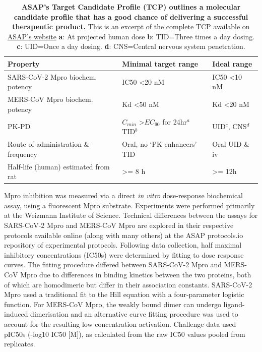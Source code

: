 \documentclass[journal=jcim,manuscript=article]{achemso}
\begin{document}
\begin{table}[]
\begin{tabular}{lll}
Property & Minimal target range & Ideal range \\ \hline
SARS-CoV-2 Mpro biochem. potency & IC50 \textless 20 nM & IC50 \textless 10 nM \\
MERS-CoV Mpro biochem. potency & Kd \textless 50 nM & Kd \textless 20 nM \\
PK-PD & $C_{min}$ \textgreater $EC_{90}$ for 24hr$^{a}$ TID$^{b}$ & UID$^{c}$, CNS$^{d}$ \\
Route of administration \& frequency & Oral, no ‘PK enhancers’ TID & Oral UID \& iv \\
Half-life (human) estimated from rat & \textgreater{}= 8 h & \textgreater{}= 12h
\end{tabular}
\caption{\textbf{ASAP's Target Candidate Profile (TCP) outlines a molecular candidate profile that has a good chance of delivering a successful therapeutic product.} This is an excerpt of the complete TCP available on \hyperlink{https://docs.google.com/presentation/d/1uZht18ZJnHuwMtwxY4prDBSl4SFMK-ics4ERhDgiJ2s/edit?slide=id.g285bac68500_0_227#slide=id.g285bac68500_0_227}{ASAP's website} \textbf{a}: At projected human dose\cite{page_2015} \textbf{b}: TID=Three times a day dosing. \textbf{c}: UID=Once a day dosing. \textbf{d}: CNS=Central nervous system penetration. }
\label{table_tcp}
\end{table}
Mpro inhibition was measured via a direct \textit{in vitro} dose-response biochemical assay, using a fluorescent Mpro substrate. Experiments were performed primarily at the Weizmann Institute of Science. Technical differences between the assays for SARS-CoV-2 Mpro\cite{sars_mpro_dose_response_protocol} and MERS-CoV Mpro\cite{mers_mpro_dose_response_protocol} are explored in their respective protocols available online (along with many others) at the ASAP protocols.io repository of experimental protocols\cite{asap_protocols_io}. Following data collection, half maximal inhibitory concentrations (IC50s) were determined by fitting to dose response curves. The fitting procedure differed between SARS-CoV-2 Mpro and MERS-CoV Mpro due to differences in binding kinetics between the two proteins, both of which are homodimeric but differ in their association constants. SARS-CoV-2 Mpro used a traditional fit to the Hill equation\cite{Hill_eq_1910} with a four-parameter logistic function. For MERS-CoV Mpro, the weakly bound dimer can undergo ligand-induced dimerisation and an alternative curve fitting procedure was used to account for the resulting low concentration activation.\cite{la_kang_minh_2025} Challenge data used pIC50s (-log10 IC50 [M]), as calculated from the raw IC50 values pooled from replicates. 
\end{document}
